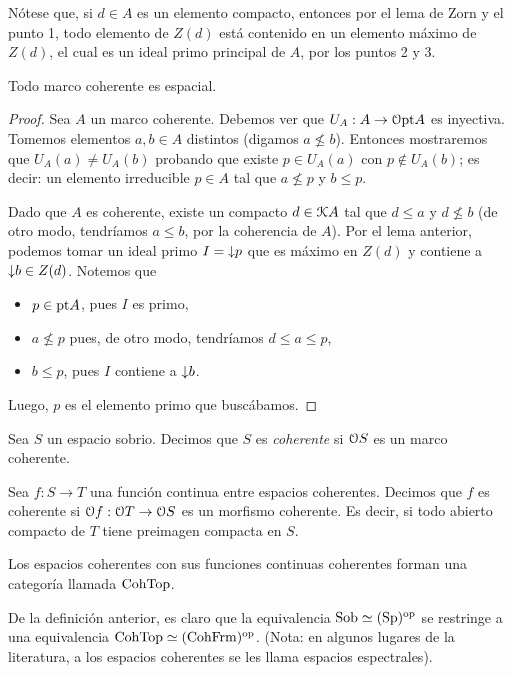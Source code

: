 Nótese que, si $d\in A$ es un elemento compacto,
entonces por el lema de Zorn y el punto 1,
todo elemento de $Z(d)$ está contenido en un elemento máximo de
$Z(d)$, el cual es un ideal primo principal de $A$,
por los puntos 2 y 3.


\begin{lemma}
    Todo marco coherente es espacial.
\end{lemma}
\begin{proof}
    Sea $A$ un marco coherente.
    Debemos ver que $U_A:A\to\cal O\pt A$ es inyectiva.
    Tomemos elementos $a,b\in A$ distintos (digamos $a\nleq b$).
    Entonces mostraremos que $U_A(a)\neq U_A(b)$
    probando que existe $p\in U_A(a)$ con $p\nin U_A(b)$;
    es decir: un elemento irreducible $p\in A$
    tal que $a\nleq p$ y $b\leq p$.
    
    Dado que $A$ es coherente, existe un compacto $d\in\cal KA$
    tal que $d\leq a$ y $d\nleq b$
    (de otro modo, tendríamos $a\leq b$, por la coherencia de $A$).
    Por el lema anterior, podemos tomar un ideal primo
    $I=\down p$ que es máximo en $Z(d)$
    y contiene a $\down b\in Z(d)$.
    Notemos que
    \begin{itemize}
        \item $p\in\pt A$, pues $I$ es primo,
        \item $a\nleq p$ pues, de otro modo,
        tendríamos $d\leq a\leq p$,
        \item $b\leq p$, pues $I$ contiene a $\down b$.
    \end{itemize}
    Luego, $p$ es el elemento primo que buscábamos.
\end{proof}

\begin{definition}
    Sea $S$ un espacio sobrio.
    Decimos que $S$ es \emph{coherente}
    si $\cal OS$ es un marco coherente.
    
    Sea $f:S\to T$ una función continua entre espacios coherentes.
    Decimos que $f$ es coherente si $\cal Of:\cal OT\to\cal OS$
    es un morfismo coherente.
    Es decir, si todo abierto compacto de $T$ tiene preimagen
    compacta en $S$.
    
    Los espacios coherentes con sus funciones continuas
    coherentes forman una categoría llamada $\CohTop$.
\end{definition}

De la definición anterior,
es claro que la equivalencia $\Sob\simeq(\Sp)^\op$
se restringe a una equivalencia $\CohTop\simeq(\CohFrm)^\op$.
(Nota: en algunos lugares de la literatura, a los espacios
coherentes se les llama espacios espectrales).

